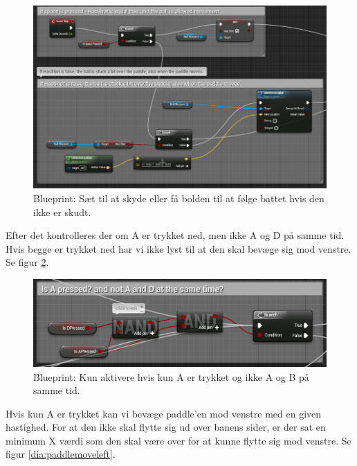 \begin{figure}
	\begin{center}
		\caption{Blueprint: Sæt til at skyde eller få bolden til at følge battet hvis den ikke er skudt.}
		\label{dia:paddlelockball}
		\includegraphics[width=0.98\linewidth]{pictures/blueprints/paddle-lock-ball}
		\end{center}
\end{figure}

Efter det kontrolleres der om A er trykket ned, men ikke A og D på samme tid. Hvis begge er trykket ned har vi ikke lyst til at den skal bevæge sig mod venstre. Se figur \ref{dia:paddleisapressed}.

\begin{figure}
	\begin{center}
		\caption{Blueprint: Kun aktivere hvis kun A er trykket og ikke A og B på samme tid.}
		\label{dia:paddleisapressed}
		\includegraphics[width=0.80\linewidth]{pictures/blueprints/paddle-is-a-pressed}
		\end{center}
\end{figure}

Hvis kun A er trykket kan vi bevæge paddle'en mod venstre med en given hastighed. For at den ikke skal flytte sig ud over banens sider, er der sat en minimum X værdi som den skal være over for at kunne flytte sig mod venstre. Se figur \ref{dia:paddlemoveleft}. 

